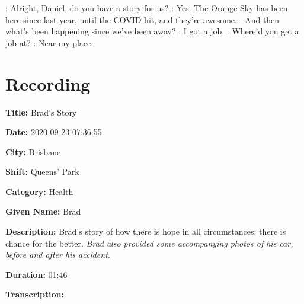 {\begin{drama}

    \volspeaks: Alright, Daniel, do you have a story for us?
    \danspeaks: Yes. The Orange Sky has been here since last year, until the COVID hit, and they're awesome.
    \volspeaks: And then what's been happening since we've been away?
    \danspeaks: I got a job.
    \volspeaks: Where'd you get a job at?
    \danspeaks: Near my place.
\end{drama}

\tocless\section{Recording }

\textbf{Title:} Brad's Story

\textbf{Date:} 2020-09-23 07:36:55

\textbf{City:} Brisbane

\textbf{Shift:} Queens' Park

\textbf{Category:} Health

\textbf{Given Name:} Brad

\textbf{Description:} Brad's story of how there is hope in all circumstances; there is chance for the better. \emph{Brad also provided some accompanying photos of his car, before and after his accident.}

\textbf{Duration:} 01:46

\textbf{Transcription:}

\begin{drama}


\end{drama}}
